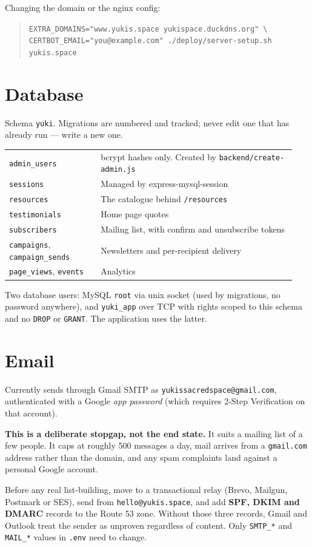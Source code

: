 \documentclass[11pt,a4paper]{article}
\newenvironment{callout}
  {\par\medskip\noindent\begin{list}{}{%
     \setlength{\leftmargin}{1.2em}\setlength{\rightmargin}{0pt}%
     \setlength{\labelwidth}{0pt}\setlength{\itemindent}{0pt}}%
   \item[]\color{ink}\hspace{-1.2em}%
   \makebox[0pt][l]{\raisebox{-0.35\baselineskip}[0pt][0pt]{%
     \textcolor{gold}{\rule{2pt}{1.15\baselineskip}}}}\hspace{1.2em}\ignorespaces}
  {\end{list}\medskip}
\newcommand{\lead}[1]{\textbf{\color{ink}#1}}
\newcommand{\code}[1]{\texttt{\small #1}}
\begin{document}
Changing the domain or the nginx config:
\begin{quote}
\code{EXTRA\_DOMAINS="www.yukis.space yukispace.duckdns.org" \textbackslash}\\
\code{CERTBOT\_EMAIL="you@example.com" ./deploy/server-setup.sh yukis.space}
\end{quote}

\section{Database}

Schema \code{yuki}. Migrations are numbered and tracked; never edit one that
has already run --- write a new one.

\begin{longtable}{@{}p{0.30\linewidth}p{0.64\linewidth}@{}}
\toprule
\code{admin\_users}     & bcrypt hashes only. Created by \code{backend/create-admin.js} \\
\code{sessions}         & Managed by express-mysql-session \\
\code{resources}        & The catalogue behind \code{/resources} \\
\code{testimonials}     & Home page quotes \\
\code{subscribers}      & Mailing list, with confirm and unsubscribe tokens \\
\code{campaigns}, \code{campaign\_sends} & Newsletters and per-recipient delivery \\
\code{page\_views}, \code{events} & Analytics \\
\bottomrule
\end{longtable}

Two database users: MySQL \code{root} via unix socket (used by migrations, no
password anywhere), and \code{yuki\_app} over TCP with rights scoped to this
schema and no \code{DROP} or \code{GRANT}. The application uses the latter.

\section{Email}

Currently sends through Gmail SMTP as
\code{yukissacredspace@gmail.com}, authenticated with a Google \emph{app
password} (which requires 2-Step Verification on that account).

\begin{callout}
\lead{This is a deliberate stopgap, not the end state.} It suits a mailing
list of a few people. It caps at roughly 500 messages a day, mail arrives from
a \code{gmail.com} address rather than the domain, and any spam complaints
land against a personal Google account.

Before any real list-building, move to a transactional relay (Brevo, Mailgun,
Postmark or SES), send from \code{hello@yukis.space}, and add \textbf{SPF,
DKIM and DMARC} records to the Route 53 zone. Without those three records,
Gmail and Outlook treat the sender as unproven regardless of content. Only
\code{SMTP\_*} and \code{MAIL\_*} values in \code{.env} need to change.
\end{callout}
\end{document}

